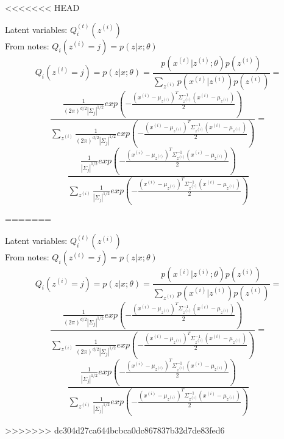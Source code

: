 <<<<<<< HEAD
\begin{answer}
Latent variables: $Q_i^{(t)}(z^{(i)})$  \\
From notes: $Q_i(z^{(i)}=j) = p(z|x;\theta)$
$$Q_i(z^{(i)}=j) = p(z|x;\theta) = \frac{p(x^{(i)}|z^{(i)};\theta) p(z^{(i)})}{\sum_{z^{(i)}} p(x^{(i)}|z^{(i)})p(z^{(i)})} = $$
$$\frac{\frac{1}{(2\pi)^{d/2}|\Sigma_j|^{1/2}}  exp(-\frac{(x^{(i)} - \mu_{z^{(i)}})^T \Sigma_{z^{(i)}}^{-1}(x^{(i)} - \mu_{z^{(i)}}) }{2})}
{\sum_{z^{(i)}}\frac{1}{(2\pi)^{d/2}|\Sigma_j|^{1/2}}  exp(-\frac{(x^{(i)} - \mu_{z^{(i)}})^T \Sigma_{z^{(i)}}^{-1}(x^{(i)} - \mu_{z^{(i)}}) }{2})} = $$
$$\frac{\frac{1}{|\Sigma_j|^{1/2}}  exp(-\frac{(x^{(i)} - \mu_{z^{(i)}})^T \Sigma_{z^{(i)}}^{-1}(x^{(i)} - \mu_{z^{(i)}}) }{2})}
{\sum_{z^{(i)}}\frac{1}{|\Sigma_j|^{1/2}}  exp(-\frac{(x^{(i)} - \mu_{z^{(i)}})^T \Sigma_{z^{(i)}}^{-1}(x^{(i)} - \mu_{z^{(i)}}) }{2})} $$
\end{answer}
=======
\begin{answer}
Latent variables: $Q_i^{(t)}(z^{(i)})$  \\
From notes: $Q_i(z^{(i)}=j) = p(z|x;\theta)$
$$Q_i(z^{(i)}=j) = p(z|x;\theta) = \frac{p(x^{(i)}|z^{(i)};\theta) p(z^{(i)})}{\sum_{z^{(i)}} p(x^{(i)}|z^{(i)})p(z^{(i)})} = $$
$$\frac{\frac{1}{(2\pi)^{d/2}|\Sigma_j|^{1/2}}  exp(-\frac{(x^{(i)} - \mu_{z^{(i)}})^T \Sigma_{z^{(i)}}^{-1}(x^{(i)} - \mu_{z^{(i)}}) }{2})}
{\sum_{z^{(i)}}\frac{1}{(2\pi)^{d/2}|\Sigma_j|^{1/2}}  exp(-\frac{(x^{(i)} - \mu_{z^{(i)}})^T \Sigma_{z^{(i)}}^{-1}(x^{(i)} - \mu_{z^{(i)}}) }{2})} = $$
$$\frac{\frac{1}{|\Sigma_j|^{1/2}}  exp(-\frac{(x^{(i)} - \mu_{z^{(i)}})^T \Sigma_{z^{(i)}}^{-1}(x^{(i)} - \mu_{z^{(i)}}) }{2})}
{\sum_{z^{(i)}}\frac{1}{|\Sigma_j|^{1/2}}  exp(-\frac{(x^{(i)} - \mu_{z^{(i)}})^T \Sigma_{z^{(i)}}^{-1}(x^{(i)} - \mu_{z^{(i)}}) }{2})} $$
\end{answer}
>>>>>>> dc304d27ca644bcbca0dc867837b32d7de83fed6
